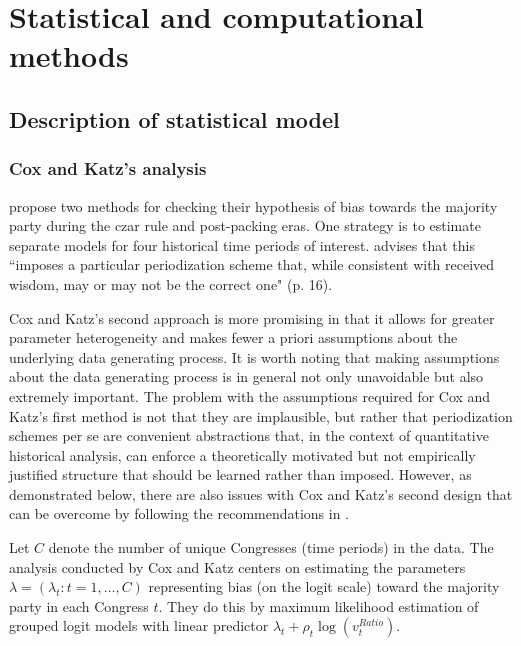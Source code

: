 \section{Statistical and computational methods}
\label{ck_stats}

\subsection{Description of statistical model}
\label{subsection_methods}

\subsubsection{Cox and Katz's analysis}

 propose two methods for checking their hypothesis 
of bias towards the majority party during the czar rule and post-packing eras. One strategy 
is to estimate separate models for four historical time periods of interest. 
 advises that this ``imposes a particular periodization scheme 
that, while consistent with received wisdom, may or may not be the correct one" (p. 16). 

Cox and Katz's second approach is more promising in that it allows for greater parameter 
heterogeneity and makes fewer a priori assumptions about the underlying data generating 
process. It is worth noting that making assumptions about the data generating process is in 
general not only unavoidable but also extremely important. The problem with the assumptions 
required for Cox and Katz's first method is not that they are implausible, but rather that 
periodization schemes per se are convenient abstractions that, in the context of quantitative 
historical analysis, can enforce a theoretically motivated but not empirically justified structure 
that should be learned rather than imposed. However, as demonstrated below, there are also 
issues with Cox and Katz's second design that can be overcome by following the recommendations in . 

Let $C$ denote the number of unique Congresses (time periods) in the data. The analysis 
conducted by Cox and Katz centers on estimating the parameters  
$\lambda = (\lambda_t : t = 1, \dots, C)$ representing bias (on the logit scale) toward the majority 
party in each Congress $t$. They do this by maximum likelihood estimation of grouped logit 
models with linear predictor $ \lambda_t + \rho_t \log{\left(v_t^{Ratio} \right)}$. 

